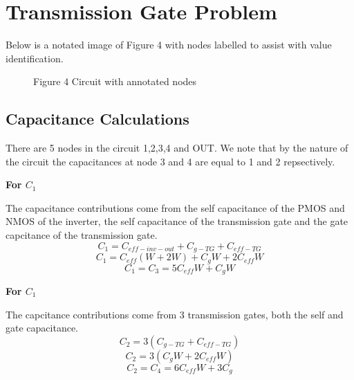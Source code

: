\documentclass[12pt]{article}
\begin{document}
\section{Transmission Gate Problem}                         %
Below is a notated image of Figure 4 with nodes labelled to assist with value identification.
\begin{figure} [H]
    \centering
    \caption{Figure 4 Circuit with annotated nodes}
\end{figure}
\subsection{Capacitance Calculations}
There are 5 nodes in the circuit 1,2,3,4 and OUT. We note that by the nature of the circuit the capacitances at node 3 and 4 are equal to 1 and 2 repsectively.

\textbf{For $C_1$}

The capacitance contributions come from the self capacitance of the PMOS and NMOS of the inverter, the self capacitance of the transmission gate and the gate capcitance of the transmission gate.
\[C_1 = C_{eff-inv-out} + C_{g-TG} + C_{eff-TG} \]
\[C_1 = C_{eff}(W + 2W) + C_g W + 2C_{eff}W \]
\[C_1 = C_3 = 5C_{eff}W + C_g W \]

\textbf{For $C_1$} 

The capcitance contributions come from 3 transmission gates, both the self and gate capacitance.
\[C_2 = 3(C_{g-TG} + C_{eff-TG}) \]
\[C_2 = 3(C_g W + 2C_{eff}W)\]
\[C_2 = C_4 = 6C_{eff}W + 3C_g \]
\end{document}
